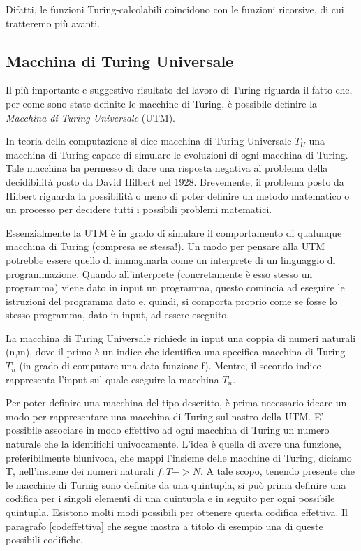 Difatti, le funzioni Turing-calcolabili coincidono con le funzioni
ricorsive, di cui tratteremo pi\`u avanti.

\subsection{Macchina di Turing Universale}

Il pi\`u importante e suggestivo risultato del lavoro di Turing
riguarda il fatto che, per come sono state definite le macchine di
Turing, \`e possibile definire la \textit{Macchina di Turing
  Universale} (UTM).

In teoria della computazione si dice macchina di Turing Universale
$T_U$ una macchina di Turing capace di simulare le evoluzioni di ogni
macchina di Turing. Tale macchina ha permesso di dare una risposta
negativa al problema della decidibilit\`a posto da David Hilbert nel
1928. Brevemente, il problema posto da Hilbert riguarda la
possibilit\`a o meno di poter definire un metodo matematico o un
processo per decidere tutti i possibili problemi matematici.

Essenzialmente la UTM \`e in grado di simulare il comportamento di
qualunque macchina di Turing (compresa se stessa!). Un modo per
pensare alla UTM potrebbe essere quello di immaginarla come un
interprete di un linguaggio di programmazione. Quando all'interprete
(concretamente \`e esso stesso un programma) viene dato in input un
programma, questo comincia ad eseguire le istruzioni del programma
dato e, quindi, si comporta proprio come se fosse lo stesso programma,
dato in input, ad essere eseguito.

La macchina di Turing Universale richiede in input una coppia di
numeri naturali (n,m), dove il primo \`e un indice che identifica una
specifica macchina di Turing $T_n$ (in grado di computare una data
funzione f). Mentre, il secondo indice rappresenta l'input sul quale
eseguire la macchina $T_n$.

Per poter definire una macchina del tipo descritto, \`e prima
necessario ideare un modo per rappresentare una macchina di Turing sul
nastro della UTM. E' possibile associare in modo effettivo ad ogni
macchina di Turing un numero naturale che la identifichi
univocamente. L'idea \`e quella di avere una funzione, preferibilmente
biunivoca, che mappi l'insieme delle macchine di Turing, diciamo T,
nell'insieme dei numeri naturali $f:T->N$. A tale scopo, tenendo
presente che le macchine di Turnig sono definite da una quintupla, si
pu\`o prima definire una codifica per i singoli elementi di una
quintupla e in seguito per ogni possibile quintupla. Esistono molti
modi possibili per ottenere questa codifica effettiva. Il paragrafo
\ref{codeffettiva} che segue mostra a titolo di esempio una di queste
possibili codifiche.

